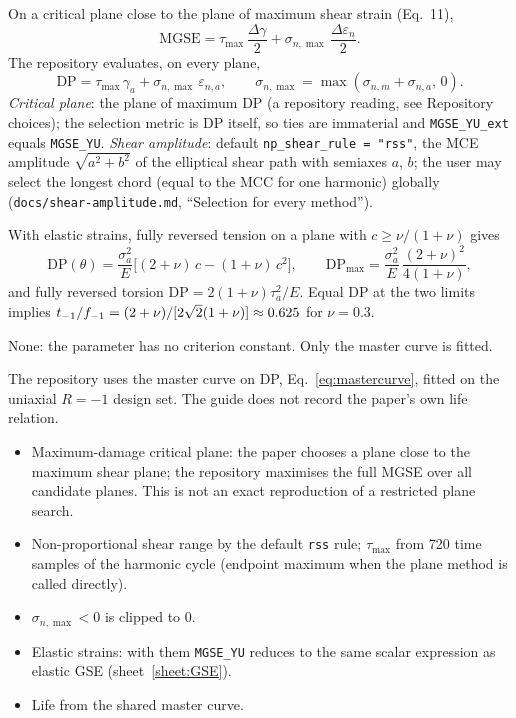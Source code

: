  On a critical plane close to the plane of maximum shear strain (Eq.~11),
\begin{equation}
\mathrm{MGSE} = \tau_{\max}\,\frac{\Delta\gamma}{2} + \sigma_{n,\max}\,\frac{\Delta\varepsilon_n}{2} .
\label{eq:mgseyu-main}
\end{equation}
The repository evaluates, on every plane,
\begin{equation}
\mathrm{DP} = \tau_{\max}\,\gamma_a + \sigma_{n,\max}\,\varepsilon_{n,a},\qquad
\sigma_{n,\max} = \max(\sigma_{n,m}+\sigma_{n,a},\,0) .
\label{eq:mgseyu-plane}
\end{equation}
\emph{Critical plane}: the plane of maximum DP (a repository reading, see Repository choices);
the selection metric is DP itself, so ties are immaterial and \texttt{MGSE\_YU\_ext} equals
\texttt{MGSE\_YU}. \emph{Shear amplitude}: default \texttt{np\_shear\_rule = "rss"}, the MCE
amplitude $\sqrt{a^2+b^2}$ of the elliptical shear path with semiaxes $a$, $b$; the user may select
the longest chord (equal to the MCC for one harmonic) globally (\texttt{docs/shear-amplitude.md},
``Selection for every method'').

With elastic strains, fully reversed tension on a plane with $c\ge\nu/(1+\nu)$ gives
\begin{equation}
\mathrm{DP}(\theta) = \frac{\sigma_a^2}{E}\bigl[(2+\nu)\,c-(1+\nu)\,c^2\bigr],\qquad
\mathrm{DP}_{\max} = \frac{\sigma_a^2}{E}\,\frac{(2+\nu)^2}{4(1+\nu)},
\label{eq:mgseyu-tension}
\end{equation}
and fully reversed torsion $\mathrm{DP}=2(1+\nu)\tau_a^2/E$. Equal DP at the two limits implies
$t_{-1}/f_{-1}=(2+\nu)/[2\sqrt2(1+\nu)]\approx0.625$ for $\nu=0.3$.

 None: the parameter has no criterion constant. Only the master
curve is fitted.

 The repository uses the master curve on DP, Eq.~\eqref{eq:mastercurve}, fitted on the
uniaxial $R=-1$ design set. The guide does not record the paper's own life relation.

\begin{itemize}
\item Maximum-damage critical plane: the paper chooses a plane close to the maximum shear plane;
  the repository maximises the full MGSE over all candidate planes. This is not an exact
  reproduction of a restricted plane search.
\item Non-proportional shear range by the default \texttt{rss} rule; $\tau_{\max}$ from 720 time
  samples of the harmonic cycle (endpoint maximum when the plane method is called directly).
\item $\sigma_{n,\max}<0$ is clipped to $0$.
\item Elastic strains: with them \texttt{MGSE\_YU} reduces to the same scalar expression as elastic
  GSE (sheet~\ref{sheet:GSE}).
\item Life from the shared master curve.
\end{itemize}

